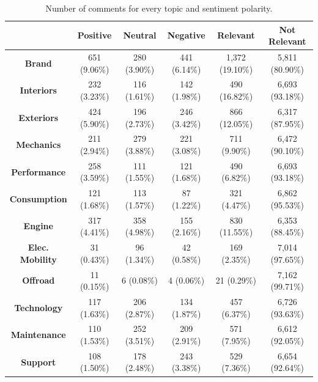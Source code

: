 \begin{table}[H]
	\renewcommand{\arraystretch}{1.3}
	\centering
	\begin{tabular}{| c | c | c | c | c | c |} 
		\hline
		& \textbf{Positive} & \textbf{Neutral} & \textbf{Negative} & \textbf{Relevant} & \textbf{Not Relevant} \\ %
		\hline
		\hline
		\textbf{Brand}& 651 (9.06\%) & 280 (3.90\%) & 441 (6.14\%) & 1,372 (19.10\%) & 5,811 (80.90\%) \\ %
		\hline
		\textbf{Interiors}& 232 (3.23\%) & 116 (1.61\%) & 142 (1.98\%) & 490 (16.82\%) & 6,693  (93.18\%) \\ %
		\hline
		\textbf{Exteriors}& 424 (5.90\%) & 196 (2.73\%) & 246 (3.42\%) & 866 (12.05\%) & 6,317 (87.95\%) \\ %
		\hline
		\textbf{Mechanics}& 211 (2.94\%) & 279 (3.88\%) & 221 (3.08\%) & 711 (9.90\%) & 6,472 (90.10\%) \\ %
		\hline
		\textbf{Performance}& 258 (3.59\%) & 111 (1.55\%) & 121 (1.68\%) & 490 (6.82\%) & 6,693 (93.18\%) \\ %
		\hline
		\textbf{Consumption}& 121 (1.68\%) & 113 (1.57\%) & 87 (1.22\%) & 321 (4.47\%) & 6,862 (95.53\%) \\ %
		\hline
		\textbf{Engine}& 317 (4.41\%) & 358 (4.98\%) & 155 (2.16\%) & 830 (11.55\%) & 6,353 (88.45\%) \\ %
		\hline
		\textbf{Elec. Mobility}& 31 (0.43\%) & 96 (1.34\%) & 42 (0.58\%) & 169 (2.35\%) & 7,014 (97.65\%) \\ %
		\hline
		\textbf{Offroad}& 11 (0.15\%) & 6 (0.08\%) & 4 (0.06\%) & 21 (0.29\%) & 7,162 (99.71\%) \\ %
		\hline
		\textbf{Technology}& 117 (1.63\%) & 206 (2.87\%) & 134 (1.87\%) & 457 (6.37\%) & 6,726 (93.63\%) \\ %
		\hline
		\textbf{Maintenance}& 110 (1.53\%) & 252 (3.51\%) & 209 (2.91\%) & 571 (7.95\%) & 6,612 (92.05\%) \\ %
		\hline
		\textbf{Support}& 108 (1.50\%) & 178 (2.48\%) & 243 (3.38\%) & 529 (7.36\%) & 6,654 (92.64\%) \\ %
		\hline
		
	\end{tabular}
	\caption{Number of comments for every topic and sentiment polarity.}
	\label{table:annotations-distribution}
\end{table}

